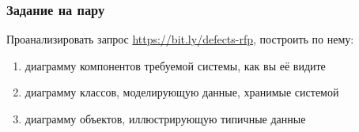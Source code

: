 \documentclass{../mcsslides}
\begin{document}
    \begin{frame}
        \frametitle{Задание на пару}
        Проанализировать запрос \url{https://bit.ly/defects-rfp}, построить по нему:
        \begin{enumerate}
            \item диаграмму компонентов требуемой системы, как вы её видите
            \item диаграмму классов, моделирующую данные, хранимые системой
            \item диаграмму объектов, иллюстрирующую типичные данные
        \end{enumerate}
    \end{frame}
\end{document}
